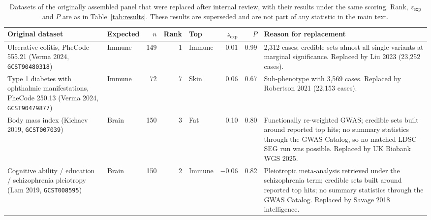 \begin{table}[htbp]\centering\footnotesize\setlength{\tabcolsep}{4pt}
\caption{Datasets of the originally assembled panel that were replaced after internal review, with their results under the same scoring. Rank, $z_{\text{exp}}$ and $P$ are as in Table~\ref{tab:results}. These results are superseded and are not part of any statistic in the main text.}\label{tab:superseded}
\begin{tabular}{p{4.6cm}lrrlrrp{5.2cm}}\toprule
Original dataset & Expected & $n$ & Rank & Top & $z_{\text{exp}}$ & $P$ & Reason for replacement \\ \midrule
Ulcerative colitis, PheCode 555.21 (Verma 2024, \texttt{GCST90480318}) & Immune & 149 & 1 & Immune & $-0.01$ & 0.99 & 2{,}312 cases; credible sets almost all single variants at marginal significance. Replaced by Liu 2023 (23{,}252 cases). \\
Type 1 diabetes with ophthalmic manifestations, PheCode 250.13 (Verma 2024, \texttt{GCST90479877}) & Immune & 72 & 7 & Skin & 0.06 & 0.67 & Sub-phenotype with 3{,}569 cases. Replaced by Robertson 2021 (22{,}153 cases). \\
Body mass index (Kichaev 2019, \texttt{GCST007039}) & Brain & 150 & 3 & Fat & 0.10 & 0.80 & Functionally re-weighted GWAS; credible sets built around reported top hits; no summary statistics through the GWAS Catalog, so no matched LDSC-SEG run was possible. Replaced by UK Biobank WGS 2025. \\
Cognitive ability / education / schizophrenia pleiotropy (Lam 2019, \texttt{GCST008595}) & Brain & 150 & 2 & Immune & $-0.06$ & 0.82 & Pleiotropic meta-analysis retrieved under the schizophrenia term; credible sets built around reported top hits; no summary statistics through the GWAS Catalog. Replaced by Savage 2018 intelligence. \\
\bottomrule\end{tabular}\end{table}
